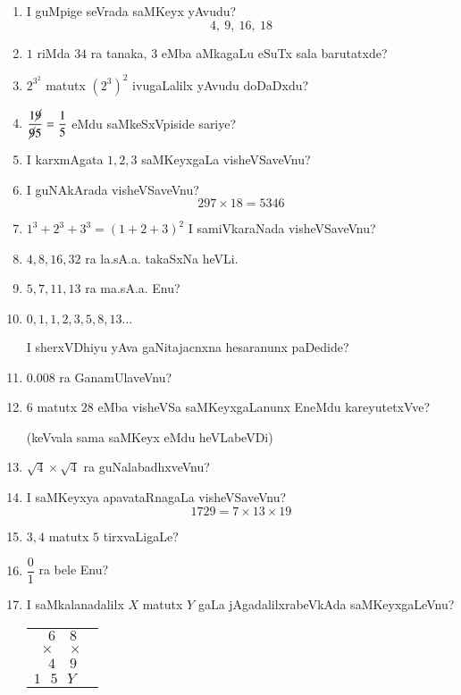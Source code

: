 \begin{enumerate}
\item I guMpige seVrada saMKeyx yAvudu?
$$
4,~9,~16,~18
$$

\item $1$ riMda $34$ ra tanaka, $3$ eMba aMkagaLu eSuTx sala barutatxde?

\item $2^{3^{2}}$ matutx $(2^{3})^{2}$ ivugaLalilx yAvudu doDaDxdu?

\item $\dfrac{1\cancel{9}}{\cancel{9}5}=\dfrac{1}{5}$ eMdu saMkeSxVpiside sariye?

\item I karxmAgata $1,2,3$ saMKeyxgaLa visheVSaveVnu?

\item I guNAkArada visheVSaveVnu?
$$
297\times 18=5346
$$

\item $1^{3}+2^{3}+3^{3}=(1+2+3)^{2}$ I samiVkaraNada visheVSaveVnu?

\item $4,8,16,32$ ra la.sA.a. takaSxNa heVLi.

\item $5,7,11,13$ ra ma.sA.a. Enu?

\item $0,1,1,2,3,5,8,13\ldots$

I sherxVDhiyu yAva gaNitajacnxna hesaranunx paDedide?

\item $0.008$ ra GanamUlaveVnu?

\item $6$ matutx $28$ eMba visheVSa saMKeyxgaLanunx EneMdu kareyutetxVve?

(keVvala sama saMKeyx eMdu heVLabeVDi)

\item $\sqrt{4}\times \sqrt{4}$ ra guNalabadhxveVnu?

\item I saMKeyxya apavataRnagaLa visheVSaveVnu?
$$
1729=7\times 13\times 19
$$

\item $3,4$ matutx $5$ tirxvaLigaLe?

\item $\dfrac{0}{1}$ ra bele Enu?

\item I saMkalanadalilx $X$ matutx $Y$ gaLa jAgadalilxrabeVkAda saMKeyxgaLeVnu?
\begin{center}
\begin{tabular}{c}
$6\quad 8$\\
$\times \quad \times $\\
$4 \quad 9$\\
\hline
$1~~~ 5 ~~ ~Y~~~~~$
\end{tabular}
\end{center}


\end{enumerate}
